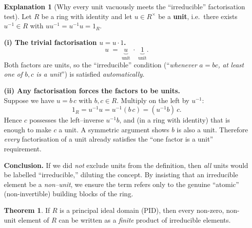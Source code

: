 \documentclass[12pt]{article}
\theoremstyle{definition} %
\newtheorem{theorem}{Theorem}
\newtheorem{explanation}{Explanation}
\theoremstyle{plain} %
\begin{document}
\begin{explanation}[Why every unit vacuously meets the “irreducible”
  factorisation test]
      Let $R$ be a ring with identity and let $u\in R^{\times}$ be a
      \textbf{unit}, i.e.\ there exists $u^{-1}\in R$ with
      $uu^{-1}=u^{-1}u = 1_R$.
  
      \medskip
      \textbf{(i)  The trivial factorisation \(\displaystyle u = u\cdot 1\).}
      \[
          u \;=\; \underbrace{u}_{\text{unit}}\;\cdot\;
                  \underbrace{1}_{\text{unit}} .
      \]
      Both factors are units, so the “irreducible” condition
      (“\emph{whenever \(a = bc\), at least one of \(b,c\) is a unit}”)
      is satisfied \emph{automatically}.
  
      \medskip
      \textbf{(ii)  Any factorisation forces the factors to be units.}\\
      Suppose we have \(\displaystyle u = b\,c\) with \(b,c\in R\).
      Multiply on the left by \(u^{-1}\):
      \[
          1_R = u^{-1}u = u^{-1}(b\,c) = (u^{-1}b)\,c .
      \]
      Hence \(c\) possesses the left–inverse \(u^{-1}b\), and (in a ring
      with identity) that is enough to make \(c\) a unit.
      A symmetric argument shows \(b\) is also a unit.  
      Therefore \emph{every} factorisation of a unit already satisfies
      the “one factor is a unit” requirement.
  
      \medskip
      \textbf{Conclusion.}  
      If we did \emph{not} exclude units from the definition, then
      \emph{all} units would be labelled “irreducible,” diluting the
      concept.  By insisting that an irreducible element be a
      \emph{non–unit}, we ensure the term refers only to the genuine
      “atomic” (non-invertible) building blocks of the ring.
  \end{explanation}
  \begin{theorem}
    If $R$ is a principal ideal domain (PID), then every non-zero,
    non-unit element of $R$ can be written as a \emph{finite} product of
    irreducible elements.
\end{theorem}
\end{document}
